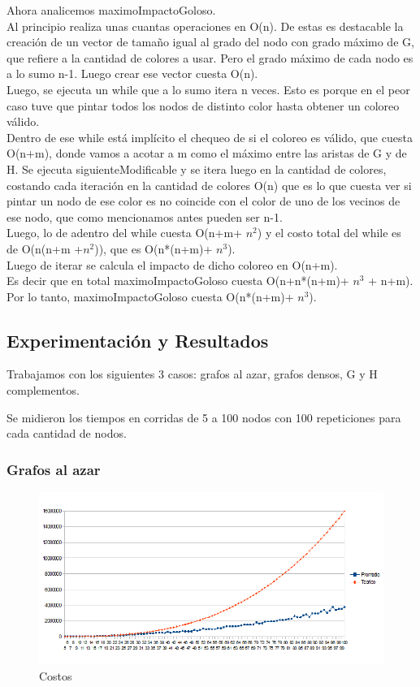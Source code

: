 \indent Ahora analicemos maximoImpactoGoloso.\\
\indent Al principio realiza unas cuantas operaciones en O(n). De estas es destacable la creación de un vector de tamaño igual al grado del nodo con grado máximo de G, que refiere a la cantidad de colores a usar. Pero el grado máximo de cada nodo es a lo sumo n-1. Luego crear ese vector cuesta O(n).\\
\indent Luego, se ejecuta un while que a lo sumo itera n veces. Esto es porque en el peor caso tuve que pintar todos los nodos de distinto color hasta obtener un coloreo válido.\\
\indent Dentro de ese while está implícito el chequeo de si el coloreo es válido, que cuesta O(n+m), donde vamos a acotar a m como el máximo entre las aristas de G y de H. Se ejecuta siguienteModificable y se itera luego en la cantidad de colores, costando cada iteración en la cantidad de colores O(n) que es lo que cuesta ver si pintar un nodo de ese color es no coincide con el color de uno de los vecinos de ese nodo, que como mencionamos antes pueden ser n-1.\\
\indent Luego, lo de adentro del while cuesta O(n+m+ $n^{2}$) y el costo total del while es de O(n(n+m +$n^{2}$)), que es O(n*(n+m)+ $n^{3}$).\\
\indent Luego de iterar se calcula el impacto de dicho coloreo en O(n+m).\\
\indent Es decir que en total maximoImpactoGoloso cuesta O(n+n*(n+m)+ $n^{3}$ + n+m).\\
\indent Por lo tanto, maximoImpactoGoloso cuesta O(n*(n+m)+ $n^{3}$).\\
 
\subsection{Experimentación y Resultados}
\quad Trabajamos con los siguientes 3 casos: grafos al azar, grafos densos, G y H complementos.

\quad Se midieron los tiempos en corridas de  5 a 100 nodos con 100 repeticiones para cada cantidad de nodos.

\subsubsection{Grafos al azar}

\begin{figure}[H]
	\centering
	\includegraphics[scale=0.8]{goloso-tiempos-Azar.png}
\caption{Costos}
\end{figure}

